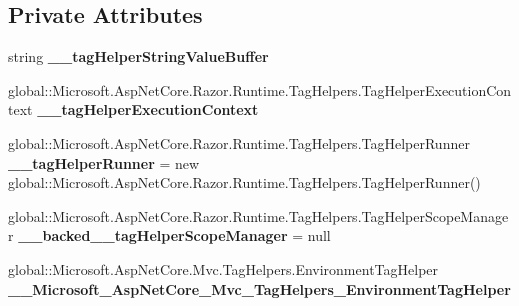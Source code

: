 \subsection*{Private Attributes}
\begin{DoxyCompactItemize}
\item 
\mbox{\label{class_asp_net_core_1_1_views___shared_____validation_scripts_partial_ad4b06232233f185d144540b3dad3087a}} 
string {\bfseries \+\_\+\+\_\+tag\+Helper\+String\+Value\+Buffer}
\item 
\mbox{\label{class_asp_net_core_1_1_views___shared_____validation_scripts_partial_a3f45b02aba3428cee64adf583c4d5a72}} 
global\+::\+Microsoft.\+Asp\+Net\+Core.\+Razor.\+Runtime.\+Tag\+Helpers.\+Tag\+Helper\+Execution\+Context {\bfseries \+\_\+\+\_\+tag\+Helper\+Execution\+Context}
\item 
\mbox{\label{class_asp_net_core_1_1_views___shared_____validation_scripts_partial_a13a2166ecd90137e07e3e9e645341019}} 
global\+::\+Microsoft.\+Asp\+Net\+Core.\+Razor.\+Runtime.\+Tag\+Helpers.\+Tag\+Helper\+Runner {\bfseries \+\_\+\+\_\+tag\+Helper\+Runner} = new global\+::\+Microsoft.\+Asp\+Net\+Core.\+Razor.\+Runtime.\+Tag\+Helpers.\+Tag\+Helper\+Runner()
\item 
\mbox{\label{class_asp_net_core_1_1_views___shared_____validation_scripts_partial_aee610f5fe2a186dd991e7a6a6d36dc5d}} 
global\+::\+Microsoft.\+Asp\+Net\+Core.\+Razor.\+Runtime.\+Tag\+Helpers.\+Tag\+Helper\+Scope\+Manager {\bfseries \+\_\+\+\_\+backed\+\_\+\+\_\+tag\+Helper\+Scope\+Manager} = null
\item 
\mbox{\label{class_asp_net_core_1_1_views___shared_____validation_scripts_partial_ac97f22380bf89bafafa9ac4f50bcda09}} 
global\+::\+Microsoft.\+Asp\+Net\+Core.\+Mvc.\+Tag\+Helpers.\+Environment\+Tag\+Helper {\bfseries \+\_\+\+\_\+\+Microsoft\+\_\+\+Asp\+Net\+Core\+\_\+\+Mvc\+\_\+\+Tag\+Helpers\+\_\+\+Environment\+Tag\+Helper}
\item 
\mbox{\label{class_asp_net_core_1_1_views___shared_____validation_scripts_partial_a8f2aa552857552465528464e390b341b}} 

\end{DoxyCompactItemize}
